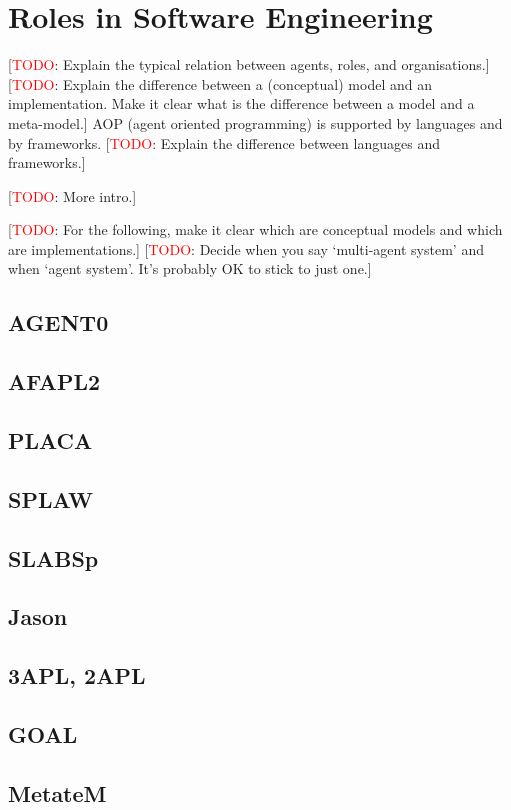 \documentclass{article}
\newcommand{\todo}[1]{[\textcolor{red}{TODO}: #1]}
\begin{document}
\section{Roles in Software Engineering}
\label{sec:software_engineering}

\todo{Explain the typical relation between agents, roles, and
  organisations.}
\todo{Explain the difference between a (conceptual) model and an
  implementation. Make it clear what is the difference between a
  model and a meta-model.}
AOP (agent oriented programming) is supported by languages and by
frameworks.  \todo{Explain the difference between languages and
frameworks.}


\todo{More intro.}

\todo{For the following, make it clear which are conceptual models and
  which are implementations.}
\todo{Decide when you say `multi-agent system' and when `agent system'.
  It's probably OK to stick to just one.}

\subsection{AGENT0}
\subsection{AFAPL2}
\subsection{PLACA}
\subsection{SPLAW}
\subsection{SLABSp}
\subsection{Jason}
\subsection{3APL, 2APL}
\subsection{GOAL}
\subsection{MetateM}
\end{document}
